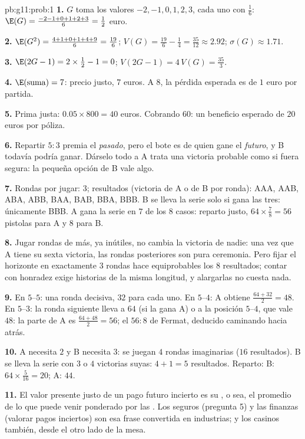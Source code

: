 \begin{solution}{pb:g11:prob:1}
\textbf{1.} $G$ toma los valores $-2, -1, 0, 1, 2, 3$, cada uno con
 $\frac16$: $\E(G) = \frac{-2 - 1 + 0 + 1 + 2 + 3}{6} =
\frac12$ euro.

\textbf{2.} $\E(G^2) = \frac{4 + 1 + 0 + 1 + 4 + 9}{6} = \frac{19}{6}$;
$V(G) = \frac{19}{6} - \frac14 = \frac{35}{12} \approx 2.92$;
$\sigma(G) \approx 1.71$.

\textbf{3.} $\E(2G - 1) = 2 \times \frac12 - 1 = 0$;
$V(2G - 1) = 4\,V(G) = \frac{35}{3}$.

\textbf{4.} $\E(\text{suma}) = 7$: precio justo, $7$ euros. A $8$, la
pérdida esperada es de $1$ euro por partida.

\textbf{5.} Prima justa: $0.05 \times 800 = 40$ euros. Cobrando $60$: un
beneficio esperado de $20$ euros por póliza.

\textbf{6.} Repartir $5:3$ premia el \emph{pasado}, pero el bote es de
quien gane el \emph{futuro}, y B todavía podría ganar. Dárselo todo a A
trata una victoria probable como si fuera segura: la pequeña opción de B
vale algo.

\textbf{7.} Rondas por jugar: $3$; resultados (victoria de A o de B por
ronda): AAA, AAB, ABA, ABB, BAA, BAB, BBA, BBB. B se lleva la serie solo
si gana las tres: únicamente BBB. A gana la serie en $7$ de los $8$ casos:
reparto justo, $64 \times \frac78 = 56$ pistolas para A y $8$ para B.

\textbf{8.} Jugar rondas de más, ya inútiles, no cambia la victoria de
nadie: una vez que A tiene su sexta victoria, las rondas posteriores son
pura ceremonia. Pero fijar el horizonte en exactamente $3$ rondas hace
equiprobables los $8$ resultados; contar con honradez exige historias de
la misma longitud, y alargarlas no cuesta nada.

\textbf{9.} En $5$--$5$: una ronda decisiva, $32$ para cada uno. En
$5$--$4$: A obtiene $\frac{64 + 32}{2} = 48$. En $5$--$3$: la ronda
siguiente lleva a $64$ (si la gana A) o a la posición $5$--$4$, que vale
$48$: la parte de A es $\frac{64 + 48}{2} = 56$; el $56 : 8$ de Fermat,
deducido caminando hacia atrás.

\textbf{10.} A necesita $2$ y B necesita $3$: se juegan $4$ rondas
imaginarias ($16$ resultados). B se lleva la serie con $3$ o $4$ victorias
suyas: $4 + 1 = 5$ resultados. Reparto:
B: $64 \times \frac{5}{16} = 20$; A: $44$.

\textbf{11.} El valor presente justo de un pago futuro incierto es su
, o sea, el promedio de lo que puede venir ponderado por las
. Los seguros (pregunta 5) y las finanzas (valorar pagos
inciertos) son esa frase convertida en industrias; y los casinos también,
desde el otro lado de la mesa.


\end{solution}
